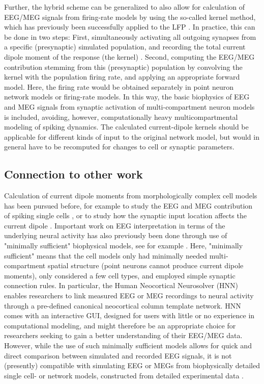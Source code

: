 \documentclass[preprint,10pt,authoryear]{elsarticle}
\begin{document}
Further, the hybrid scheme can be generalized to also allow for calculation of EEG/MEG signals from firing-rate models by using the so-called kernel method, which has previously been successfully applied to the LFP \citep{HAGEN2016, Skaar2020, Telenczuk2020}. In practice, this can be done in two steps: First, simultaneously activating all outgoing synapses from a specific (presynaptic) simulated population, and recording the total current dipole moment of the response (the kernel) \citep{HAGEN2016}. Second, computing the EEG/MEG contribution stemming from this (presynaptic) population by convolving the kernel with the population firing   
rate, and applying an appropriate forward model. Here, the firing rate would be obtained separately in point neuron network models or firing-rate models. In this way, the basic biophysics of EEG and MEG signals from
synaptic activation of multi-compartment neuron models is included, avoiding, however, computationally heavy multicompartmental modeling of spiking dynamics.  
The calculated current-dipole kernels should be applicable for different kinds of input to the original network model, but would in general have to be recomputed for changes to cell or synaptic parameters. 

\subsection{Connection to other work}
Calculation of current dipole moments from morphologically complex cell models has been pursued before, for example to study the EEG and MEG contribution of spiking single cells \citep{Murakami2006}, or to study how the synaptic input location affects the current dipole \citep{LINDEN2010, AHLFORS2015}.
Important work on EEG interpretation in terms of the underlying neural activity has also previously been done through use of "minimally sufficient" biophysical models, see for example \cite{Murakami2002, Murakami2003, Jones2007, Jones2009, Sliva2018, NEYMOTIN2020}. 
Here, "minimally sufficient" means that the cell models only had minimally needed multi-compartment spatial structure (point neurons cannot produce current dipole moments), only considered a few cell types, and employed simple synaptic connection rules.
In particular, the Human Neocortical Neurosolver (HNN) \citep{NEYMOTIN2020} enables researchers to link measured EEG or MEG recordings to neural activity through a pre-defined canonical neocortical column template network. 
HNN comes with an interactive GUI, designed for users with little or no experience in computational modeling, and might therefore be an appropriate choice for researchers seeking to gain a better understanding of their EEG/MEG data.  
However, while the use of such minimally sufficient models allows for quick and direct comparison between simulated and recorded EEG signals, it is not (presently) compatible with simulating EEG or MEGs from biophysically detailed single cell- or network models, constructed from detailed experimental data \citep{Reimann2013, Egger2014, MARKRAM2015, HAGEN2016, Gratiy2018, Arkhipov2018, BILLEH2019}.  
\end{document}
